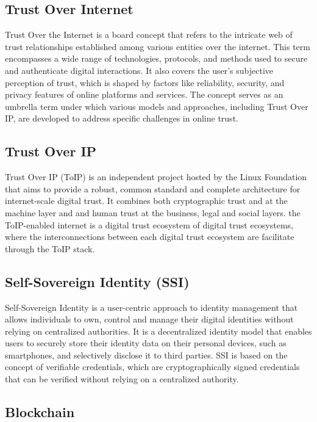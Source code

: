 \subsection{Trust Over Internet}

Trust Over the Internet is a board concept that refers to the intricate web of trust relationships established among various entities over the internet. This term encompasses a wide range of technologies, protocols, and methods used to secure and authenticate digital interactions. It also covers the user's subjective perception of trust, which is shaped by factors like reliability, security, and privacy features of online platforms and services. The concept serves as an umbrella term under which various models and approaches, including Trust Over IP, are developed to address specific challenges in online trust.

\subsection{Trust Over IP}

Trust Over IP (ToIP) is an independent project hosted by the Linux Foundation that aims to provide a robust, common standard and complete architecture for internet-scale digital trust. It combines both cryptographic trust and at the machine layer and and human trust at the business, legal and social layers. the ToIP-enabled internet is a digital trust ecosystem of digital trust ecosystems, where the interconnections between each digital trust ecosystem are facilitate through the ToIP stack.

\subsection{Self-Sovereign Identity (SSI)}

Self-Sovereign Identity is a user-centric approach to identity management that allows individuals to own, control and manage their digital identities without relying on centralized authorities. It is a decentralized identity model that enables users to securely store their identity data on their personal devices, such as smartphones, and selectively disclose it to third parties. SSI is based on the concept of verifiable credentials, which are cryptographically signed credentials that can be verified without relying on a centralized authority.

\subsection{Blockchain}

